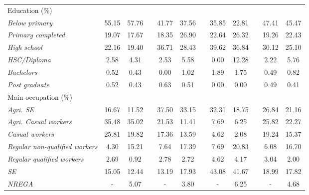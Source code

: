 \documentclass[a4paper, 11pt, onecolumn]{article}
\begin{document}
\begin{table}[htbp]
{\begin{tabular}{lccccccccccc}
    Education (\%) &   &   &   &   &   &   &   &   &   &   &  \\
    \hspace*{0.2cm} \textit{Below primary} & 55.15 & 57.76 &   & 41.77 & 37.56 &   & 35.85 & 22.81 &   & 47.41 & 45.47 \\
    \hspace*{0.2cm} \textit{Primary completed} & 19.07 & 17.67 &   & 18.35 & 26.90 &   & 22.64 & 26.32 &   & 19.26 & 22.43 \\
    \hspace*{0.2cm} \textit{High school} & 22.16 & 19.40 &   & 36.71 & 28.43 &   & 39.62 & 36.84 &   & 30.12 & 25.10 \\
    \hspace*{0.2cm} \textit{HSC/Diploma} & 2.58 & 4.31 &   & 2.53 & 5.58 &   & 0.00 & 12.28 &   & 2.22 & 5.76 \\
    \hspace*{0.2cm} \textit{Bachelors} & 0.52 & 0.43 &   & 0.00 & 1.02 &   & 1.89 & 1.75 &   & 0.49 & 0.82 \\
    \hspace*{0.2cm} \textit{Post graduate} & 0.52 & 0.43 &   & 0.63 & 0.51 &   & 0.00 & 0.00 &   & 0.49 & 0.41 \\
    Main occupation (\%) &   &   &   &   &   &   &   &   &   &   &  \\
    \hspace*{0.2cm} \textit{Agri. SE} & 16.67 & 11.52 &   & 37.50 & 33.15 &   & 32.31 & 18.75 &   & 26.84 & 21.16 \\
    \hspace*{0.2cm} \textit{Agri. Casual workers} & 35.48 & 35.02 &   & 21.53 & 11.41 &   & 7.69 & 6.25 &   & 25.82 & 22.27 \\
    \hspace*{0.2cm} \textit{Casual workers} & 25.81 & 19.82 &   & 17.36 & 13.59 &   & 4.62 & 2.08 &   & 19.24 & 15.37 \\
    \hspace*{0.2cm} \textit{Regular non-qualified workers} & 4.30 & 15.21 &   & 7.64 & 17.39 &   & 7.69 & 20.83 &   & 6.08 & 16.70 \\
    \hspace*{0.2cm} \textit{Regular qualified workers} & 2.69 & 0.92 &   & 2.78 & 2.72 &   & 4.62 & 4.17 &   & 3.04 & 2.00 \\
    \hspace*{0.2cm} \textit{SE} & 15.05 & 12.44 &   & 13.19 & 17.93 &   & 43.08 & 41.67 &   & 18.99 & 17.82 \\
    \hspace*{0.2cm} \textit{NREGA} & - & 5.07 &   & - & 3.80 &   & - & 6.25 &   & - & 4.68 \\
    \bottomrule
    \end{tabular}%

	}
  \label{Global}%
\end{table}%
\end{document}
